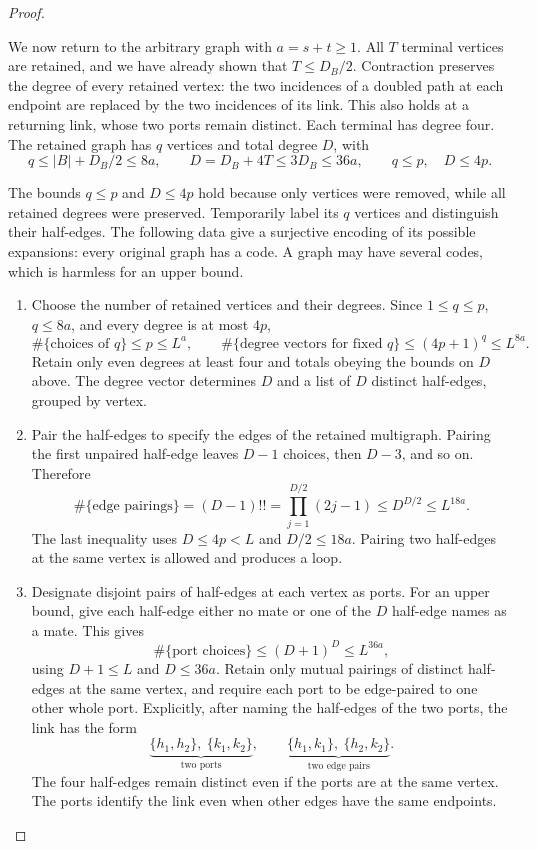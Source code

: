 \documentclass[11pt]{article}
\theoremstyle{definition}
\theoremstyle{remark}
\theoremstyle{plain}
\begin{document}
\begin{proof}


\begin{samepage}
We now return to the arbitrary graph with $a=s+t\ge1$.
All $T$ terminal vertices are retained, and we have already shown
that $T\le D_B/2$. Contraction preserves the degree of every retained
vertex: the two incidences of a doubled path at each endpoint are
replaced by the two incidences of its link. This also holds at a
returning link, whose two ports remain distinct. Each terminal has
degree four.
The retained graph has \(q\) vertices and total degree \(D\), with
\begin{equation}\label{eq:retained-graph}
 q\le |B|+D_B/2\le8a,\qquad
 D=D_B+4T\le3D_B\le36a,\qquad q\le p,\quad D\le4p.
\end{equation}
\end{samepage}
The bounds $q\le p$ and $D\le4p$ hold because only vertices were
removed, while all retained degrees were preserved.
Temporarily label its \(q\) vertices and distinguish their half-edges.
The following data give a surjective encoding of its possible
expansions: every original graph has a code. A graph may have
several codes, which is harmless for an upper bound.

\begin{enumerate}
\item Choose the number of retained vertices and their degrees.
Since $1\le q\le p$, $q\le8a$, and every degree is at most $4p$,
\[
 \#\{\text{choices of }q\}\le p\le L^a,\qquad
 \#\{\text{degree vectors for fixed }q\}\le(4p+1)^q\le L^{8a}.
\]
Retain only even degrees at least four and totals obeying the
bounds on $D$ above. The degree vector determines $D$ and a list
of $D$ distinct half-edges, grouped by vertex.

\item Pair the half-edges to specify the edges of the retained
multigraph. Pairing the first unpaired half-edge leaves $D-1$
choices, then $D-3$, and so on. Therefore
\[
 \#\{\text{edge pairings}\}=(D-1)!!
 =\prod_{j=1}^{D/2}(2j-1)\le D^{D/2}\le L^{18a}.
\]
The last inequality uses $D\le4p<L$ and $D/2\le18a$.
Pairing two half-edges at the same vertex is allowed and produces a loop.

\item Designate disjoint pairs of half-edges at each vertex as ports.
For an upper bound, give each half-edge either no mate or one of
the $D$ half-edge names as a mate. This gives
\[
 \#\{\text{port choices}\}\le(D+1)^D\le L^{36a},
\]
using $D+1\le L$ and $D\le36a$. Retain only mutual pairings of
distinct half-edges at the same vertex, and require each port to
be edge-paired to one other whole port. Explicitly, after naming
the half-edges of the two ports, the link has the form
\[
 \underbrace{\{h_1,h_2\},\ \{k_1,k_2\}}_{\text{two ports}},
 \qquad
 \underbrace{\{h_1,k_1\},\ \{h_2,k_2\}}_{\text{two edge pairs}}.
\]
The four half-edges remain distinct even if the ports are at the
same vertex. The ports identify the link even when other edges
have the same endpoints.


\end{enumerate}
\end{proof}
\end{document}
